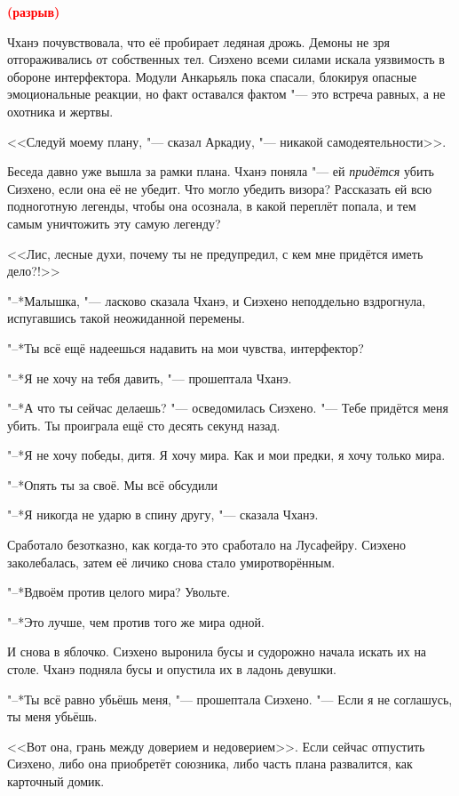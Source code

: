\documentclass[a4paper,10pt,fleqn]{book}
\newcommand{\ldotst}{\so{...}\xspace}
\newcommand{\spacing}{\textcolor{red}{\textbf{(разрыв)}}}
\begin{document}
\spacing

Чханэ почувствовала, что её пробирает ледяная дрожь.
Демоны не зря отгораживались от собственных тел.
Сиэхено всеми силами искала уязвимость в обороне интерфектора.
Модули Анкарьяль пока спасали, блокируя опасные эмоциональные реакции, но факт оставался фактом "--- это встреча равных, а не охотника и жертвы.

<<Следуй моему плану, "--- сказал Аркадиу, "--- никакой самодеятельности>>.

Беседа давно уже вышла за рамки плана.
Чханэ поняла "--- ей \textit{придётся} убить Сиэхено, если она её не убедит.
Что могло убедить визора?
Рассказать ей всю подноготную легенды, чтобы она осознала, в какой переплёт попала, и тем самым уничтожить эту самую легенду?

<<Лис, лесные духи, почему ты не предупредил, с кем мне придётся иметь дело?!>>

"--*Малышка, "--- ласково сказала Чханэ, и Сиэхено неподдельно вздрогнула, испугавшись такой неожиданной перемены.

"--*Ты всё ещё надеешься надавить на мои чувства, интерфектор?

"--*Я не хочу на тебя давить, "--- прошептала Чханэ.

"--*А что ты сейчас делаешь? "--- осведомилась Сиэхено.
"--- Тебе придётся меня убить.
Ты проиграла ещё сто десять секунд назад.

"--*Я не хочу победы, дитя.
Я хочу мира.
Как и мои предки, я хочу только мира.

"--*Опять ты за своё.
Мы всё обсудили\ldotst

"--*Я никогда не ударю в спину другу, "--- сказала Чханэ.

Сработало безотказно, как когда-то это сработало на Лусафейру.
Сиэхено заколебалась, затем её личико снова стало умиротворённым.

"--*Вдвоём против целого мира?
Увольте.

"--*Это лучше, чем против того же мира одной.

И снова в яблочко.
Сиэхено выронила бусы и судорожно начала искать их на столе.
Чханэ подняла бусы и опустила их в ладонь девушки.

"--*Ты всё равно убьёшь меня, "--- прошептала Сиэхено.
"--- Если я не соглашусь, ты меня убьёшь.

<<Вот она, грань между доверием и недоверием>>.
Если сейчас отпустить Сиэхено, либо она приобретёт союзника, либо часть плана развалится, как карточный домик.
\end{document}

